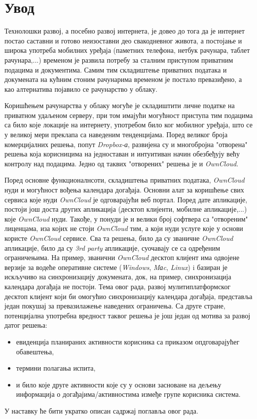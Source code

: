 \chapter{Увод}

Технолошки развој, а посебно развој интернета, је довео до тога да је интернет постао саставни и готово неизоставни део свакодневног живота, а постојање и широка употреба мобилних уређаја (паметних телефона, нетбук рачунара, таблет рачунара,...) временом је развила потребу за сталним приступом приватним подацима и документима. Самим тим складиштење приватних података и докумената на кућним стоним рачунарима временом је постало превазиђено, а као алтернатива појавило се рачунарство у облаку.

Коришћењем рачунарства у облаку могуће је складиштити личне податке на приватном удаљеном серверу, при том имајући могућност приступа тим подацима са било које локације на интернету, употребом било ког мобилног уређаја, што се у великој мери преклапа са наведеним тенденцијама. Поред великог броја комерцијалних решења, попут \textit{Dropbox-а}, развијена су и многобројна "отворена" решења која корисницима на једноставан и интуитиван начин обезбеђују већу контролу над подацима. Једно од таквих "отворених" решења је и \textit{OwnCloud}. 

Поред основне функционалнсоти, складиштења приватних података, \textit{OwnCloud} нуди и могућност вођења календара догађаја. Основни алат за коришћење свих сервиса које нуди \textit{OwnCloud} је одговарајући веб портал. Поред дате апликације, постоји још доста других апликација (десктоп клијенти, мобилне апликације,...) које \textit{OwnCloud} нуди. Такође, у понуди је и велики број софтвера са "отвореним" лиценцама, иза којих не стоји \textit{OwnCloud} тим, а који нуди услуге које у основи користе \textit{OwnCloud} сервисе. Сва та решења, било да су званичне \textit{OwnCloud} апликације, било да су \textit{3rd party} апликације, суочавају се са одређеним ограничењима. На пример, званични \textit{OwnCloud} десктоп клијент има одвојене верзије за водеће оперативне системе (\textit{Windows}, \textit{Mаc}, \textit{Linux}) i базиран је искључиво на синхронизацију докумената, док, на пример, синхронизација календара догађаја не постоји. 
Тема овог рада, развој мулитиплатформског десктоп клијент који би омогућио синхронизацију календара догађаја, представља један покушај за превазилажење наведених ограничења. Са друге стране, потенцијална употребна вредност таквог решења је још један од мотива за развој датог решења:
\begin{itemize}
	\item{евиденција планираних активности корисника са приказом опдговарајућег обавештења},
	\item{термини полагања испита},
	\item{и било које друге активности које су у основи засноване на дељењу информација о догађајима/активностима измеђе групе корисника система}.
\end{itemize} 
У наставку ће бити укратко описан садржај поглавља овог рада.

